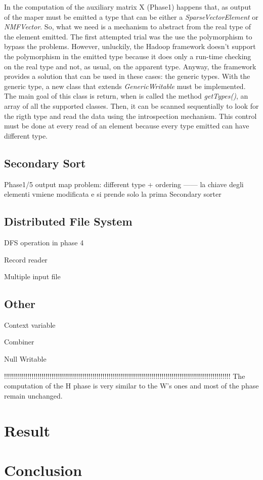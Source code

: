 \documentclass[a4paper,12pt]{article}
\newcommand{\METHOD}[1] {\textit{#1}}
\newcommand{\CLASS}[1] {\textit{#1}}
\begin{document}
In the computation of the auxiliary matrix X (Phase1) happens that, as output of the maper must be emitted a type that can be either a \CLASS{SparseVectorElement} or \CLASS{NMFVector}. So, what we need is a mechanism to abstract from the real type of the element emitted. The first attempted trial was the use the polymorphism to bypass the problems. However, unluckily, the Hadoop framework doesn't support the polymorphism in the emitted type because it does only a run-time checking on the real type and not, as usual, on the apparent type. Anyway, the framework provides a solution that can be used in these cases: the generic types. With the generic type, a new class that extends \CLASS{GenericWritable} must be implemented. The main goal of this class is return, when is called the method \METHOD{getTypes()}, an array of all the supported classes. Then, it can be scanned sequentially to look for the rigth type and read the data using the introspection mechanism. This control must be done at every read of an element because every type emitted can have different type.



\subsection{Secondary Sort}


Phase1/5 output map problem: different type + ordering ------ la chiave degli elementi vmiene modificata e si prende solo la prima
Secondary sorter

\subsection{Distributed File System}

DFS operation in phase 4

Record reader

Multiple input file


\subsection{Other}

Context variable

Combiner

Null Writable






!!!!!!!!!!!!!!!!!!!!!!!!!!!!!!!!!!!!!!!!!!!!!!!!!!!!!!!!!!!!!!!!!!!!!!!!!!!!!!!!!!!!!!!!!!!!!!!!!!!!!!!!!!!!!!!!!!!
The computation of the H phase is very similar to the W's ones and
most of the phase remain unchanged.
 

\section{Result}

\section{Conclusion}



\nocite{*}




\end{document}
